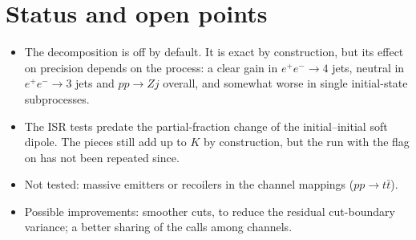 \documentclass[11pt,a4paper]{article}
\begin{document}
\section{Status and open points}
\begin{itemize}
\item The decomposition is off by default. It is exact by construction, but
      its effect on precision depends on the process: a clear gain in
      $e^+e^-\to4$ jets, neutral in $e^+e^-\to3$ jets and $pp\to Zj$
      overall, and somewhat worse in single initial-state subprocesses.
\item The ISR tests predate the partial-fraction change of the
      initial--initial soft dipole. The pieces still add up to $K$ by
      construction, but the run with the flag on has not been repeated since.
\item Not tested: massive emitters or recoilers in the channel mappings
      ($pp\to t\bar t$).
\item Possible improvements: smoother cuts, to reduce the residual cut-boundary
      variance; a better sharing of the calls among channels.
\end{itemize}
\end{document}
